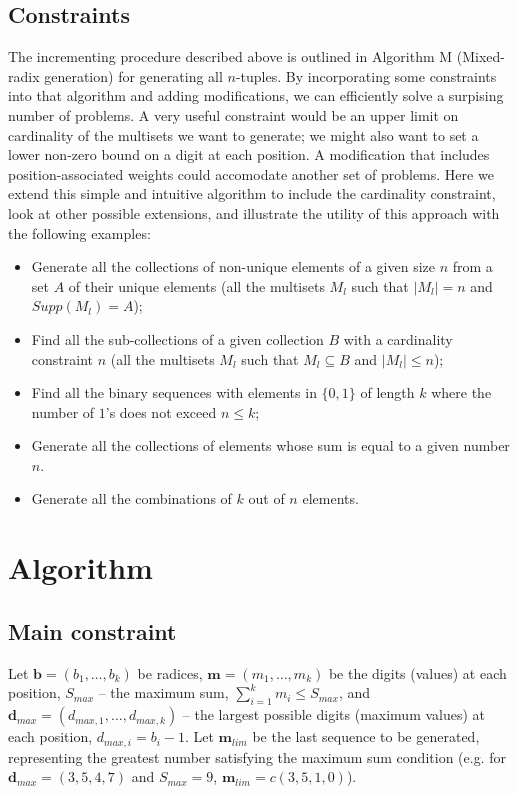 \documentclass[11pt]{article}
\begin{document}
\subsection*{Constraints}

The incrementing procedure described above is outlined in \cite{knuth2011art} Algorithm M (Mixed-radix generation) for generating all $n$-tuples. By incorporating some constraints into that algorithm and adding modifications, we can efficiently solve a surpising number of problems. A very useful constraint would be an upper limit on cardinality of the multisets we want to generate; we might also want to set a lower non-zero bound on a digit at each position. A modification that includes position-associated weights could accomodate another set of problems. Here we extend this simple and intuitive algorithm to include the cardinality constraint, look at other possible extensions, and illustrate the utility of this approach with the following examples: 
\begin{itemize}
  \item Generate all the collections of non-unique elements of a given size $n$ from a set $A$ of their unique elements (all the multisets $M_l$ such that $|M_l| = n$ and $Supp(M_l) = A$);
  \item Find all the sub-collections of a given collection $B$ with a cardinality constraint $n$ (all the multisets $M_l$ such that $M_l \subseteq B$ and $|M_l| \leqslant n$);
  \item Find all the binary sequences with elements in $\{0, 1\}$ of length $k$ where the number of $1$'s does not exceed $n \leqslant k$; 
  \item Generate all the collections of elements whose sum is equal to a given number $n$.
  \item Generate all the combinations of $k$ out of $n$ elements.
\end{itemize}

\section{Algorithm}
\subsection{Main constraint}

Let $\boldsymbol{b} = (b_1, \dotsc, b_k)$ be radices, $\boldsymbol{m} = (m_1, \dotsc, m_k)$ be the digits (values) at each position, $S_{max}$ -- the maximum sum, $\sum_{i = 1}^{k} m_i \leqslant S_{max}$, and $\boldsymbol{d}_{max} = (d_{max, 1}, \dotsc, d_{max, k})$ -- the largest possible digits (maximum values) at each position, $d_{max, i} = b_i - 1$. Let $\boldsymbol{m}_{lim}$ be the last sequence to be generated, representing the greatest number satisfying the maximum sum condition (e.g. for $\boldsymbol{d}_{max} = (3, 5, 4, 7)$ and $S_{max} = 9$, $\boldsymbol{m}_{lim} = c(3, 5, 1, 0)$). \\ 
\end{document}
